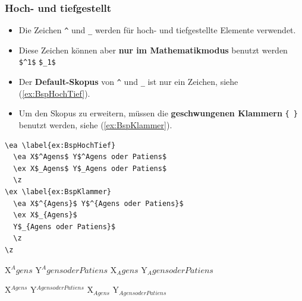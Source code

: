 \begin{frame}[fragile]
\frametitle{Hoch- und tiefgestellt}

\begin{itemize}
	\item Die Zeichen \lstinline|^| und \lstinline|_| werden für hoch- und tiefgestellte Elemente verwendet. 
	
	\item Diese Zeichen können aber \textbf{nur im Mathematikmodus} benutzt werden \lstinline|$^1$| \lstinline|$_1$|
\end{itemize}
\end{frame}


\begin{frame}[fragile]

\begin{itemize}	
	\item Der \textbf{Default-Skopus} von \lstinline|^| und \lstinline|_| ist nur ein Zeichen, siehe (\ref{ex:BspHochTief}).
	
	\item Um den Skopus zu erweitern, müssen die \textbf{geschwungenen Klammern} \lstinline|{ }| benutzt werden, siehe (\ref{ex:BspKlammer}). 
\end{itemize}

{\scriptsize
\begin{lstlisting}
\ea \label{ex:BspHochTief}
  \ea X$^Agens$ Y$^Agens oder Patiens$
  \ex X$_Agens$ Y$_Agens oder Patiens$
  \z 
\ex \label{ex:BspKlammer}
  \ea X$^{Agens}$ Y$^{Agens oder Patiens}$
  \ex X$_{Agens}$ 
  Y$_{Agens oder Patiens}$
  \z 
\z 
\end{lstlisting}
}
\ea \label{ex:BspHochTief}
\ea X$^Agens$ Y$^Agens oder Patiens$
\ex X$_Agens$ Y$_Agens oder Patiens$
\z 

\ex \label{ex:BspKlammer}
\ea X$^{Agens}$ Y$^{Agens oder Patiens}$
\ex X$_{Agens}$ Y$_{Agens oder Patiens}$
\z 
\z 

\end{frame}


